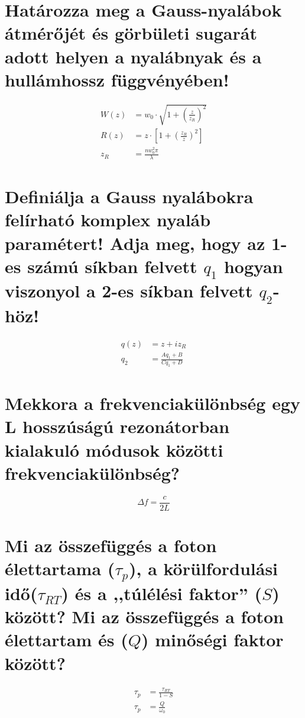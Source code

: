 \documentclass[12pt, a4paper]{article}
\begin{document}
\section{Határozza meg a Gauss-nyalábok átmérőjét és görbületi sugarát adott helyen a nyalábnyak és a hullámhossz függvényében!}
\begin{align}
W(z) &= w_0\cdot\sqrt{1+\left(\frac{z}{z_R}\right)^2}\\
R(z) &= z\cdot\left[1+\left(\frac{z_R}{z}\right)^2\right]\\
z_R &= \frac{nw_0^2\pi}{\lambda}
\end{align}

\section{Definiálja a Gauss nyalábokra felírható komplex nyaláb paramétert! Adja meg, hogy az 1-es számú síkban felvett $q_1$ hogyan viszonyol a 2-es síkban felvett $q_2$-höz!}
\begin{align}
q(z) &= z+iz_R\\
q_2 &= \frac{Aq_1+B}{Cq_1+D}
\end{align}

\section{Mekkora a frekvenciakülönbség egy L hosszúságú rezonátorban kialakuló módusok közötti frekvenciakülönbség?}
\begin{equation}
\Delta f = \frac{c}{2L}
\end{equation}

\section{Mi az összefüggés a foton élettartama ($\tau_p$), a körülfordulási idő($\tau_{RT}$) és a ,,túlélési faktor'' ($S$) között? Mi az összefüggés a foton élettartam és ($Q$) minőségi faktor között?}
\begin{align}
\tau_p &= \frac{\tau_{RT}}{1-S}\\
\tau_p &= \frac{Q}{\omega_0}
\end{align}
\end{document}
